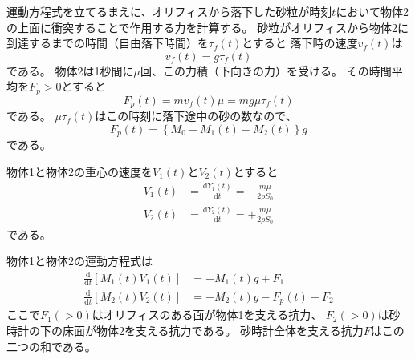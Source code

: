 \documentclass[]{article}
\begin{document}
運動方程式を立てるまえに、オリフィスから落下した砂粒が時刻$t$において物体2の上面に衝突することで作用する力を計算する。
砂粒がオリフィスから物体2に到達するまでの時間（自由落下時間）を$\tau_f(t)$とすると
落下時の速度$v_f(t)$は
\begin{equation} \label{250703161618} 
   v_f(t) = g\tau_f(t)
\end{equation}
である。
物体2は1秒間に$\mu$回、この力積（下向きの力）を受ける。
その時間平均を$F_p>0$とすると
\begin{equation} \label{250703161334} 
  F_p(t)  = m v_f(t) \mu = m g \mu \tau_f(t)
\end{equation}
である。
$\mu\tau_f(t)$はこの時刻に落下途中の砂の数なので、
\begin{equation} \label{250703172127} 
   F_p(t) = \left\{M_0-M_1(t) -M_2(t)\right\} g
\end{equation}
である。




物体1と物体2の重心の速度を$V_1(t)$と$V_2(t)$とすると
\begin{align}
   V_1(t) &= \frac{\mathrm{d} Y_1(t)}{\mathrm{d} t} = - \frac{m \mu }{2\rho S_0}  \label{250703154817a} \\
   V_2(t) &= \frac{\mathrm{d} Y_2(t)}{\mathrm{d} t} = + \frac{m \mu }{2\rho S_0}   \label{250703154817b} 
\end{align}
である。




物体1と物体2の運動方程式は
\begin{align}
   \frac{\mathrm{d} }{\mathrm{d} t} \left[
   									M_1(t) V_1(t)
   								\right] &=   - M_1(t) g + F_1\label{250703155015a} \\
   \frac{\mathrm{d} }{\mathrm{d} t} \left[
   									M_2(t) V_2(t)
   								\right]  &=  - M_2(t) g -F_p(t)+ F_2 \label{250703155015b} 
\end{align}
ここで$F_1 (>0)$はオリフィスのある面が物体1を支える抗力、
$F_2 (>0)$は砂時計の下の床面が物体2を支える抗力である。
砂時計全体を支える抗力$F$はこの二つの和である。
\end{document}
